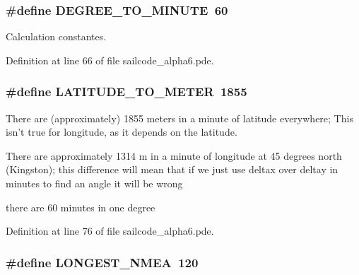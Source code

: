\hypertarget{group__globalconstants_gaa0fe8a3893ebea828d2bb49ef23e3530}{
\subsubsection[{\-D\-E\-G\-R\-E\-E\-\_\-\-T\-O\-\_\-\-M\-I\-N\-U\-T\-E}]{\setlength{\rightskip}{0pt plus 5cm}\#define \-D\-E\-G\-R\-E\-E\-\_\-\-T\-O\-\_\-\-M\-I\-N\-U\-T\-E~60}}
\label{group__globalconstants_gaa0fe8a3893ebea828d2bb49ef23e3530}


\-Calculation constantes. 



\-Definition at line 66 of file sailcode\-\_\-alpha6.\-pde.

\hypertarget{group__globalconstants_ga334339ea1bc712a2689665192c02bfad}{
\subsubsection[{\-L\-A\-T\-I\-T\-U\-D\-E\-\_\-\-T\-O\-\_\-\-M\-E\-T\-E\-R}]{\setlength{\rightskip}{0pt plus 5cm}\#define \-L\-A\-T\-I\-T\-U\-D\-E\-\_\-\-T\-O\-\_\-\-M\-E\-T\-E\-R~1855}}
\label{group__globalconstants_ga334339ea1bc712a2689665192c02bfad}


\-There are (approximately) 1855 meters in a minute of latitude everywhere; \-This isn't true for longitude, as it depends on the latitude. 

\-There are approximately 1314 m in a minute of longitude at 45 degrees north (\-Kingston); this difference will mean that if we just use deltax over deltay in minutes to find an angle it will be wrong

there are 60 minutes in one degree 

\-Definition at line 76 of file sailcode\-\_\-alpha6.\-pde.

\hypertarget{group__globalconstants_ga0038dced6b4ccdfe2ef833cc1965ca73}{
\subsubsection[{\-L\-O\-N\-G\-E\-S\-T\-\_\-\-N\-M\-E\-A}]{\setlength{\rightskip}{0pt plus 5cm}\#define \-L\-O\-N\-G\-E\-S\-T\-\_\-\-N\-M\-E\-A~120}}
\label{group__globalconstants_ga0038dced6b4ccdfe2ef833cc1965ca73}


